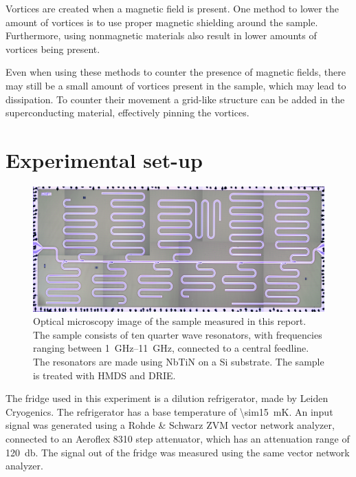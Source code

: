   Vortices are created when a magnetic field is present. One method to lower the amount of vortices is to use proper magnetic shielding around the sample. Furthermore, using nonmagnetic materials also result in lower amounts of vortices being present.

  Even when using these methods to counter the presence of magnetic fields, there may still be a small amount of vortices present in the sample, which may lead to dissipation. To counter their movement a grid-like structure can be added in the superconducting material, effectively pinning the vortices.



\chapter{Experimental set-up}
  \label{ch:Experimental set-up}

  \begin{figure}
      \begin{center}
          \includegraphics[width=\textwidth]{Figures/DRIE/All_set4.png}
      \end{center}
      \caption{Optical microscopy image of the sample measured in this report. The sample consists of ten quarter wave resonators, with frequencies ranging between \SIrange{1}{11}{\giga \hertz}, connected to a central feedline. The resonators are made using NbTiN on a Si substrate. The sample is treated with HMDS and DRIE.}
      \label{fig:set4}
  \end{figure}

  The fridge used in this experiment is a dilution refrigerator, made by Leiden Cryogenics. The refrigerator has a base temperature of \SI{\sim15}{\milli \kelvin}. An input signal was generated using a Rohde \& Schwarz ZVM vector network analyzer, connected to an Aeroflex 8310 step attenuator, which has an attenuation range of \SI{120}{\decibel}. The signal out of the fridge was measured using the same vector network analyzer.

